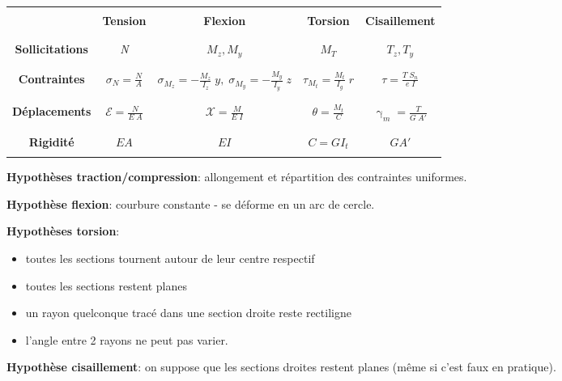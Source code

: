 \documentclass[a4paper]{article}
\begin{document}
\begin{center} \begin{tabular}{|c|c|c|c|c|} \hline &&&& \\
& \textbf{Tension} & \textbf{Flexion} & \textbf{Torsion} & \textbf{Cisaillement} \\ &&&& \\ \hline &&&& \\
\textbf{Sollicitations} & \emph{N} & $ M_z, M_y $ & $ M_T $ & $ T_z, T_y $ \\ &&&& \\ \hline &&&& \\
\textbf{Contraintes} & $\displaystyle \sigma_N = \frac{N}{A} $ & $\displaystyle \sigma_{M_z} = - \frac{M_z}{I_z} \; y, \; \sigma_{M_y} = - \frac{M_y}{I_y} \; z $ & $\displaystyle \tau_{M_t} = \frac{M_t}{I_g} \; r $ & $\displaystyle \tau = \frac{T \; S_n}{e \; I} $ \\ &&&& \\ \hline &&&& \\
\textbf{Déplacements} & $\displaystyle \mathcal{E} = \frac{N}{E \; A} $ & $\displaystyle \mathcal{X} = \frac{M}{E \; I} $ & $\displaystyle \theta = \frac{M_t}{C} $ & $\displaystyle \upgamma_m = \frac{T}{G \; A'} $ \\ &&&& \\ \hline &&&& \\
\textbf{Rigidité} & $ E A $ & $ E I $ & $ C = G I_t $ & $ G A' $ \\ &&&& \\ \hline
\end{tabular} \end{center}


\textbf{Hypothèses traction/compression}: allongement et répartition des contraintes uniformes.

\textbf{Hypothèse flexion}: courbure constante - se déforme en un arc de cercle.

\textbf{Hypothèses torsion}: 
\begin{itemize}
    \item toutes les sections tournent autour de leur centre respectif
    \item toutes les sections restent planes
    \item un rayon quelconque tracé dans une section droite reste rectiligne
    \item l'angle entre 2 rayons ne peut pas varier.
\end{itemize}

\textbf{Hypothèse cisaillement}: on suppose que les sections droites restent planes (même si c'est faux en pratique).
\end{document}
